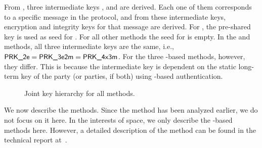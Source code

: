 From \mGxy{}, three intermediate keys \mPRKtwo, \mPRKthree{} and
\mPRKthree{} are derived.
%
Each one of them corresponds to a specific message in the protocol, and from
these intermediate keys, encryption and integrity keys for that message are
derived.
%
For \mPskPsk{}, the pre-shared key is used as seed for \mPRKtwo.
%
For all other methods the seed for \mPRKtwo{} is empty.
%
In the \mPskPsk{} and \mSigSig{} methods, all three intermediate keys
are the same, i.e., $\textsf{PRK\_2e}{} = \textsf{PRK\_3e2m}{} = \textsf{PRK\_4x3m}$.
%
For the three \mStat-based methods, however, they differ.
%
This is because the intermediate key \mPRKthree{} is dependent on the static
long-term key of the party (or parties, if both) using \mStat{}-based
authentication.
%

\begin{figure}[!h]
\scalebox{.75}{

}
\caption{Joint key hierarchy for all methods.
}
\label{fig:kdfdiagram}
\end{figure}


We now describe the \mEdhoc{} methods. Since the \mSigSig{} method has been analyzed earlier, we do not focus on it here. In the interests of space, we only describe the \mStat-based methods here. However, a detailed description of the \mPskPsk{} method can be found in the technical report at~\cite{edhocTamarinRepo}. 
%

